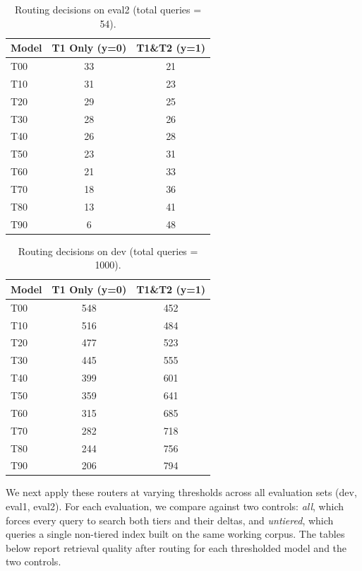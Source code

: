 \documentclass[11pt]{article}
\begin{document}
\begin{table}[H]
\centering
\small
\begin{tabular}{lcc}
\toprule
\textbf{Model} & \textbf{T1 Only (y=0)} & \textbf{T1\&T2 (y=1)} \\
\midrule
T00 & 33 & 21 \\
T10 & 31 & 23 \\
T20 & 29 & 25 \\
T30 & 28 & 26 \\
T40 & 26 & 28 \\
T50 & 23 & 31 \\
T60 & 21 & 33 \\
T70 & 18 & 36 \\
T80 & 13 & 41 \\
T90 & 6 & 48 \\
\bottomrule
\end{tabular}
\caption{Routing decisions on eval2 (total queries = 54).}
\label{tab:router-eval2}
\end{table}

\begin{table}[H]
\centering
\small
\begin{tabular}{lcc}
\toprule
\textbf{Model} & \textbf{T1 Only (y=0)} & \textbf{T1\&T2 (y=1)} \\
\midrule
T00 & 548 & 452 \\
T10 & 516 & 484 \\
T20 & 477 & 523 \\
T30 & 445 & 555 \\
T40 & 399 & 601 \\
T50 & 359 & 641 \\
T60 & 315 & 685 \\
T70 & 282 & 718 \\
T80 & 244 & 756 \\
T90 & 206 & 794 \\
\bottomrule
\end{tabular}
\caption{Routing decisions on dev (total queries = 1000).}
\label{tab:router-dev}
\end{table}

We next apply these routers at varying thresholds across all evaluation sets (dev, eval1, eval2). For each evaluation, we compare against two controls: \emph{all}, which forces every query to search both tiers and their deltas, and \emph{untiered}, which queries a single non-tiered index built on the same working corpus. The tables below report retrieval quality after routing for each thresholded model and the two controls.
\end{document}
